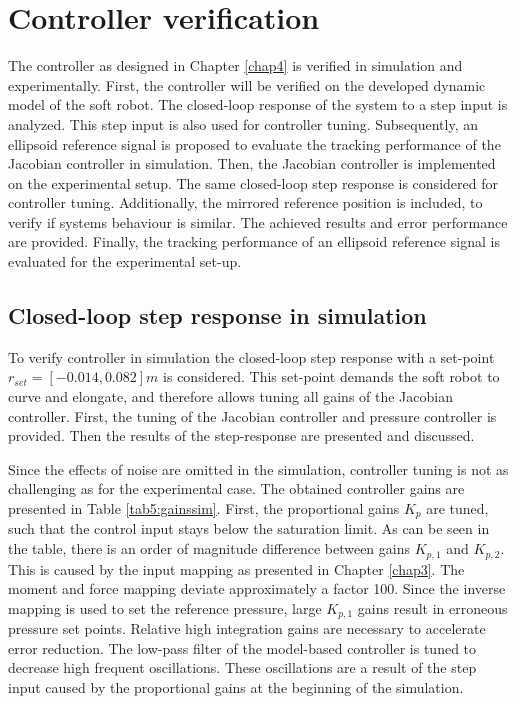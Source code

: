 \section{Controller verification}

The controller as designed in Chapter \ref{chap4} is verified in simulation and experimentally. First, the controller will be verified on the developed dynamic model of the soft robot. The closed-loop response of the system to a step input is analyzed. This step input is also used for controller tuning. Subsequently, an ellipsoid reference signal is proposed to evaluate the tracking performance of the Jacobian controller in simulation. Then, the Jacobian controller is implemented on the experimental setup. The same closed-loop step response is considered for controller tuning. Additionally, the mirrored reference position is included, to verify if systems behaviour is similar. The achieved results and error performance are provided. Finally, the tracking performance of an ellipsoid reference signal is evaluated for the experimental set-up. 


\subsection*{Closed-loop step response in simulation}

To verify controller in simulation the closed-loop step response with a set-point $r_{set} = [-0.014,0.082]m$ is considered. This set-point demands the soft robot to curve and elongate, and therefore allows tuning all gains of the Jacobian controller. First, the tuning of the Jacobian controller and pressure controller is provided. Then the results of the step-response are presented and discussed. 

Since the effects of noise are omitted in the simulation, controller tuning is not as challenging as for the experimental case. The obtained controller gains are presented in Table \ref{tab5:gainssim}. First, the proportional gains $K_p$ are tuned, such that the control input stays below the saturation limit. As can be seen in the table, there is an order of magnitude difference between gains $K_{p,1}$ and $K_{p,2}$. This is caused by the input mapping as presented in Chapter \ref{chap3}. The moment and force mapping deviate approximately a factor 100. Since the inverse mapping is used to set the reference pressure, large $K_{p,1}$ gains result in erroneous pressure set points. Relative high integration gains are necessary to accelerate error reduction. The low-pass filter of the model-based controller is tuned to decrease high frequent oscillations. These oscillations are a result of the step input caused by the proportional gains at the beginning of the simulation. 



